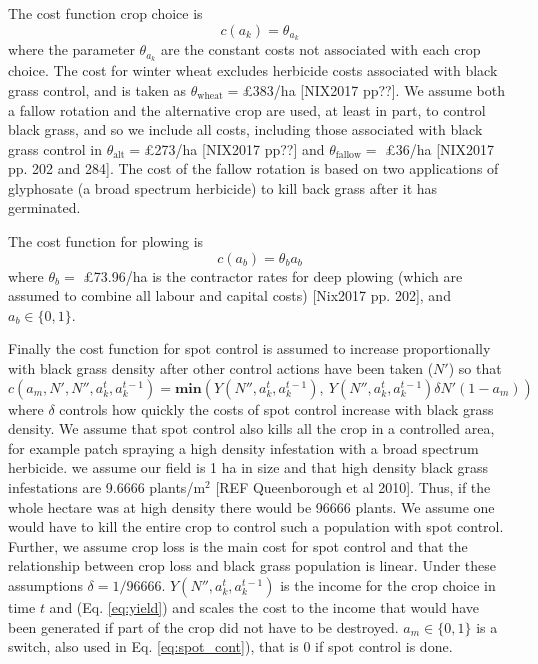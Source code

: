 \documentclass[12pt, a4paper]{article}
\begin{document}
The cost function crop choice is 
\begin{equation}\label{eq:crop_cost}
	c(a_k) = \theta_{a_k}
\end{equation}   
where the parameter $\theta_{a_k}$ are the constant costs not associated with each crop choice. The cost for winter wheat excludes herbicide costs associated with black grass control, and is taken as $\theta_\text{wheat} = $\pounds 383/ha [NIX2017 pp??]. We assume both a fallow rotation and the alternative crop are used, at least in part, to control black grass, and so we include all costs, including those associated with black grass control in $\theta_\text{alt} = $\pounds 273/ha [NIX2017 pp??] and $\theta_\text{fallow} = $ \pounds 36/ha [NIX2017 pp. 202 and 284]. The cost of the fallow rotation is based on two applications of glyphosate (a broad spectrum herbicide) to kill back grass after it has germinated.       

The cost function for plowing is 
\begin{equation}\label{eq:plow_cost}
	c(a_b) = \theta_b a_b 
\end{equation}
where $\theta_b = $ \pounds 73.96/ha is the contractor rates for deep plowing (which are assumed to combine all labour and capital costs) [Nix2017 pp. 202], and $a_b \in \{0, 1\}$. 

Finally the cost function for spot control is assumed to increase proportionally with black grass density after other control actions have been taken ($N'$) so that
\begin{equation}
	c(a_m, N', N'', a_k^t, a_k^{t-1}) = \textbf{min}\left( Y(N'', a_k^t, a_k^{t-1}),~ Y(N'', a_k^t, a_k^{t-1})\delta N' (1 - a_m) \right)
\end{equation}  
where $\delta$ controls how quickly the costs of spot control increase with black grass density. We assume that spot control also kills all the crop in a controlled area, for example patch spraying a high density infestation with a broad spectrum herbicide. we assume our field is 1 ha in size and that high density black grass infestations are 9.6666 plants/m$^2$ [REF Queenborough et al 2010]. Thus, if the whole hectare was at high density there would be 96666 plants. We assume one would have to kill the entire crop to control such a population with spot control. Further, we assume crop loss is the main cost for spot control and that the relationship between crop loss and black grass population is linear. Under these assumptions $\delta = 1/96666$. $Y(N'', a_k^t, a_k^{t-1})$ is the income for the crop choice in time $t$ and (Eq. \ref{eq:yield}) and scales the cost to the income that would have been generated if part of the crop did not have to be destroyed. $a_m \in \{0, 1\}$ is a switch, also used in Eq. \ref{eq:spot_cont}), that is 0 if spot control is done.        
\end{document}
